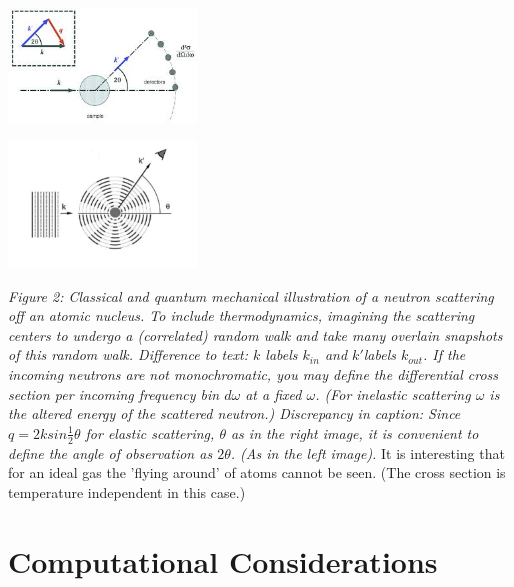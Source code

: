 \documentclass[11pt,a4paper]{article}
\begin{document}
\begin{minipage}[hbt]{5cm}
	\centering
	\includegraphics[width=5cm]{scat_CM.jpeg}
	\label{"halllo"}
\end{minipage}
\hfill
\begin{minipage}[hbt]{5cm}
	\centering
	\includegraphics[width=5cm]{scat_QM.png}
	\label{Bild2}
\end{minipage}
\newline
\textit{Figure 2: Classical and quantum mechanical illustration of a neutron scattering off an atomic nucleus. 
To include thermodynamics, imagining the scattering centers to undergo a (correlated) random walk and take many overlain snapshots
of this random walk. Difference to text: $k$ labels $k_{in}$ and $k'$labels $k_{out}$.
If the incoming neutrons are not monochromatic, you may define the differential cross section per incoming frequency bin
$d \omega$ at a fixed $\omega$. (For inelastic scattering $\omega$ is the altered energy of the scattered neutron.)\newline
Discrepancy in caption: Since $q = 2k sin \frac{1}{2} \theta$ for elastic scattering,
$\theta$ as in the right image, it is convenient to define the angle of observation as $2\theta$. (As in the left image).} 
\newline
\newline
It is interesting that for an ideal gas the 'flying around' of atoms cannot be seen. 
(The cross section is temperature independent in this case.)
\newpage



\section{Computational Considerations}
\end{document}
